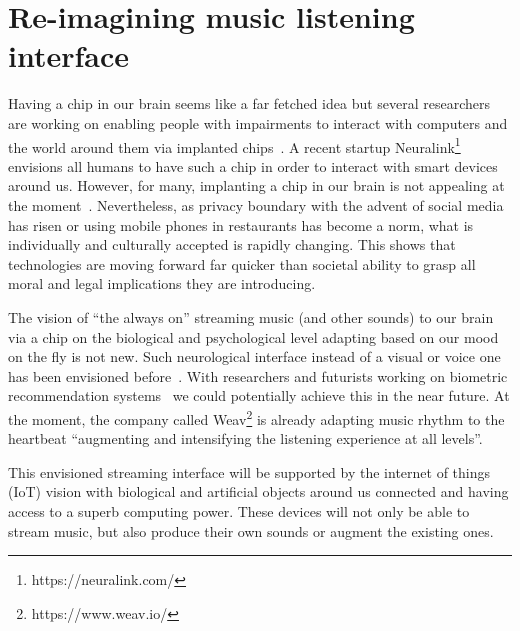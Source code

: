 \documentclass[sigchi]{acmart}
\begin{document}
\section{Re-imagining music listening interface}


Having a chip in our brain seems like a far fetched idea but several researchers are working on enabling people with impairments to interact with computers and the world around them via implanted chips~\cite{santhanam2006high}. A recent startup Neuralink\footnote{https://neuralink.com/} envisions all humans to have such a chip in order to interact with smart devices around us. However, for many, implanting a chip in our brain is not appealing at the moment~\cite{metz2019chipbrain}. Nevertheless, as privacy boundary with the advent of social media has risen or using mobile phones in restaurants has become a norm, what is individually and culturally accepted is rapidly changing. This shows that technologies are moving forward far quicker than societal ability to grasp all moral and legal implications they are introducing.

The vision of ``the always on'' streaming music (and other sounds) to our brain via a chip on the biological and psychological level adapting based on our mood on the fly is not new. Such neurological interface instead of a visual or voice one has been envisioned before~\cite{cherie2019bravenewworld}. With researchers and futurists working on biometric recommendation systems~\cite{zhang2018system} we could potentially achieve this in the near future. At the moment, the company called Weav\footnote{https://www.weav.io/} is already adapting music rhythm to the heartbeat ``augmenting and intensifying the listening experience at all levels''. 

This envisioned streaming interface will be supported by the internet of things (IoT) vision with biological and artificial objects around us connected \cite{weisman2004internet} and having access to a superb computing power. These devices will not only be able to stream music, but also produce their own sounds or augment the existing ones.  
\end{document}

